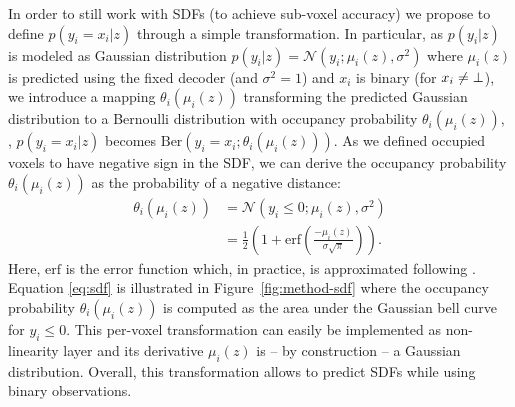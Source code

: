 In order to still work with SDFs (to achieve sub-voxel accuracy) we propose to define $p(y_i = x_i | z)$ through a simple transformation. In particular, as $p(y_i | z)$ is modeled as Gaussian distribution $p(y_i | z) = \mathcal{N}(y_i ; \mu_i(z), \sigma^2)$ where $\mu_i(z)$ is predicted using the fixed decoder (and $\sigma^2 = 1$) and $x_i$ is binary (for $x_i \neq \bot$), we introduce a mapping $\theta_i(\mu_i(z))$ transforming the predicted Gaussian distribution to a Bernoulli distribution with occupancy probability $\theta_i(\mu_i(z))$, \ie, $p(y_i = x_i|z)$ becomes $\text{Ber}(y_i = x_i; \theta_i(\mu_i(z)))$.
%
%
As we defined occupied voxels to have negative sign in the SDF, we can derive the occupancy probability $\theta_i(\mu_i(z))$ as the probability of a negative distance:
\begin{align}
\theta_i(\mu_i(z)) &= \mathcal{N}(y_i \leq 0; \mu_i(z), \sigma^2)\label{eq:sdf}\\
&= \frac{1}{2} \left(1 + \text{erf}\left(\frac{- \mu_i(z)}{\sigma \sqrt{\pi}}\right)\right).\label{eq:sdf-erf}
\end{align}
%
Here, $\text{erf}$ is the error function which, in practice, is approximated following \cite{Abramowitz1974}. Equation \eqref{eq:sdf} is illustrated in Figure~\ref{fig:method-sdf} where the occupancy probability $\theta_i(\mu_i(z))$ is computed as the area under the Gaussian bell curve for $y_i \leq 0$. This per-voxel transformation can easily be implemented as non-linearity layer and its derivative \wrt $\mu_i(z)$ is -- by construction -- a Gaussian distribution. Overall, this transformation allows to predict SDFs while using binary observations.